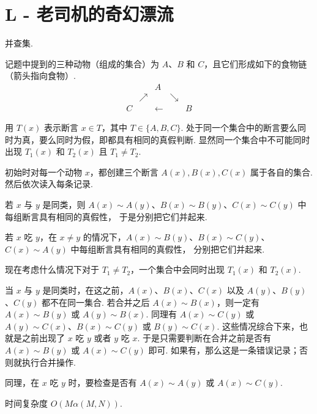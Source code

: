 \documentclass{ctexart}
\begin{document}
\section*{L - 老司机的奇幻漂流}

并查集.

记题中提到的三种动物（组成的集合）为 $A$、$B$ 和 $C$，且它们形成如下的食物链（箭头指向食物）.
\[
\begin{array}{ccccc}
&&A&&\\
&\nearrow&&\searrow&\\
C&&\gets&&B
\end{array}
\]

用 $T(x)$ 表示断言 $x \in T$，其中 $T \in \{A, B, C\}$.
处于同一个集合中的断言要么同时为真，要么同时为假，即都具有相同的真假判断.
显然同一个集合中不可能同时出现 $T_1(x)$ 和 $T_2(x)$ 且 $T_1 \ne T_2$.

初始时对每一个动物 $x$，都创建三个断言 $A(x), B(x), C(x)$ 属于各自的集合.
然后依次读入每条记录.

若 $x$ 与 $y$ 是同类，则 $A(x)\sim{}A(y)$、$B(x)\sim{}B(y)$、$C(x)\sim{}C(y)$ 中每组断言具有相同的真假性，
于是分别把它们并起来.

若 $x$ 吃 $y$，在 $x \ne y$ 的情况下，$A(x)\sim{}B(y)$、$B(x)\sim{}C(y)$、$C(x)\sim{}A(y)$ 中每组断言具有相同的真假性，
分别把它们并起来.

现在考虑什么情况下对于 $T_1 \ne T_2$，一个集合中会同时出现 $T_1(x)$ 和 $T_2(x)$.

当 $x$ 与 $y$ 是同类时，在这之前，$A(x)$、$B(x)$、$C(x)$ 以及 $A(y)$、$B(y)$、$C(y)$ 都不在同一集合.
若合并之后 $A(x)\sim{}B(x)$，则一定有 $A(x)\sim{}B(y)$ 或 $A(y)\sim{}B(x)$.
同理有 $A(x)\sim{}C(y)$ 或 $A(y)\sim{}C(x)$、$B(x)\sim{}C(y)$ 或 $B(y)\sim{}C(x)$.
这些情况综合下来，也就是之前出现了 $x$ 吃 $y$ 或者 $y$ 吃 $x$.
于是只需要判断在合并之前是否有 $A(x)\sim{}B(y)$ 或 $A(x)\sim{}C(y)$ 即可.
如果有，那么这是一条错误记录；否则就执行合并操作.

同理，在 $x$ 吃 $y$ 时，要检查是否有 $A(x)\sim{}A(y)$ 或 $A(x)\sim{}C(y)$.

时间复杂度 $O(M\alpha(M,N))$.
\end{document}
